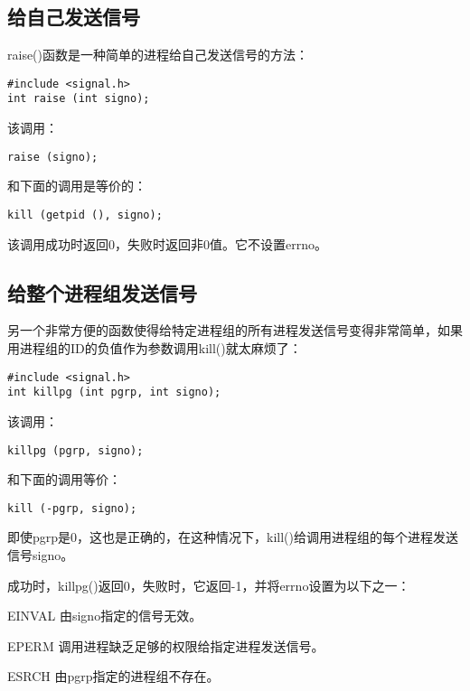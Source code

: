 \subsection{给自己发送信号}

raise()函数是一种简单的进程给自己发送信号的方法：

\begin{lstlisting}
#include <signal.h>
int raise (int signo);
\end{lstlisting}

该调用：

\begin{lstlisting}
raise (signo);
\end{lstlisting}

和下面的调用是等价的：

\begin{lstlisting}
kill (getpid (), signo);
\end{lstlisting}

该调用成功时返回0，失败时返回非0值。它不设置errno。

\subsection{给整个进程组发送信号}

另一个非常方便的函数使得给特定进程组的所有进程发送信号变得非常简单，如果用进程组的ID的负值作为参数调用kill()就太麻烦了：

\begin{lstlisting}
#include <signal.h>
int killpg (int pgrp, int signo);
\end{lstlisting}

该调用：

\begin{lstlisting}
killpg (pgrp, signo);
\end{lstlisting}

和下面的调用等价：

\begin{lstlisting}
kill (-pgrp, signo);
\end{lstlisting}

即使pgrp是0，这也是正确的，在这种情况下，kill()给调用进程组的每个进程发送信号signo。

成功时，killpg()返回0，失败时，它返回-1，并将errno设置为以下之一：

\begin{eqlist*}
\item[EINVAL] 由signo指定的信号无效。
\item[EPERM] 调用进程缺乏足够的权限给指定进程发送信号。
\item[ESRCH] 由pgrp指定的进程组不存在。
\end{eqlist*}

